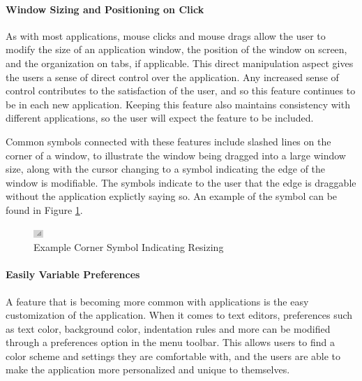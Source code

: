 \documentclass[11pt, oneside]{article}
\begin{document}
\paragraph{Window Sizing and Positioning on Click}
As with most applications, mouse clicks and mouse drags allow the user to modify the size of an application window, the position of the window on screen, and the organization on tabs, if applicable. This direct manipulation aspect gives the users a sense of direct control over the application. Any increased sense of control contributes to the satisfaction of the user, and so this feature continues to be in each new application. Keeping this feature also maintains consistency with different applications, so the user will expect the feature to be included.

Common symbols connected with these features include slashed lines on the corner of a window, to illustrate the window being dragged into a large window size, along with the cursor changing to a symbol indicating the edge of the window is modifiable. The symbols indicate to the user that the edge is draggable without the application explictly saying so. An example of the symbol can be found in Figure \ref{corner_symbol}.

\begin{figure}[h!]
    \centering
    \includegraphics[width=.3\textwidth]{photos/corner_symbol.png}
    \caption{Example Corner Symbol Indicating Resizing}
    \label{corner_symbol}
\end{figure}

\paragraph{Easily Variable Preferences}
A feature that is becoming more common with applications is the easy customization of the application. When it comes to text editors, preferences such as text color, background color, indentation rules and more can be modified through a preferences option in the menu toolbar. This allows users to find a color scheme and settings they are comfortable with, and the users are able to make the application more personalized and unique to themselves. 
\end{document}

